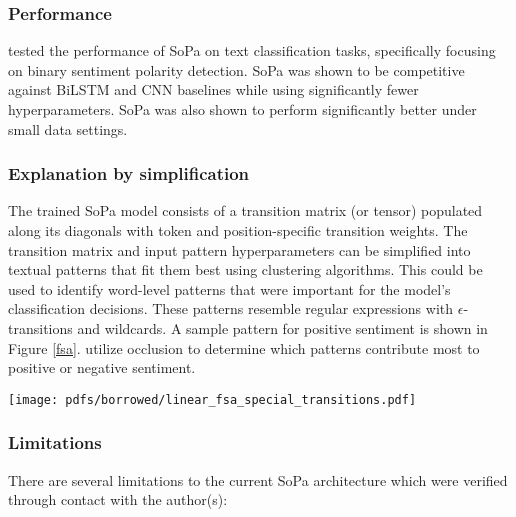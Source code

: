 \subsubsection{Performance}

\citet{schwartz2018sopa} tested the performance of SoPa on text classification
tasks, specifically focusing on binary sentiment polarity detection. SoPa was
shown to be competitive against BiLSTM and CNN baselines while using
significantly fewer hyperparameters. SoPa was also shown to perform
significantly better under small data settings.

\subsubsection{Explanation by simplification}

The trained SoPa model consists of a transition matrix (or tensor) populated
along its diagonals with token and position-specific transition weights. The
transition matrix and input pattern hyperparameters can be simplified into
textual patterns that fit them best using clustering algorithms. This could be
used to identify word-level patterns that were important for the model's
classification decisions. These patterns resemble regular expressions with
$\epsilon$-transitions and wildcards. A sample pattern for positive sentiment is
shown in Figure \ref{fsa}. \citet{schwartz2018sopa} utilize occlusion to
determine which patterns contribute most to positive or negative sentiment.

\begin{figure*}
  \centering
  \texttt{[image: pdfs/borrowed/linear\_fsa\_special\_transitions.pdf]}
  \caption{Example mimic FSA simplified from SoPa and its corresponding WFSAs
    \citep{schwartz2018sopa}}
  \label{fsa}
\end{figure*}

\subsubsection{Limitations}
\label{sopa-limitations}

There are several limitations to the current SoPa architecture which were
verified through contact with the author(s):

